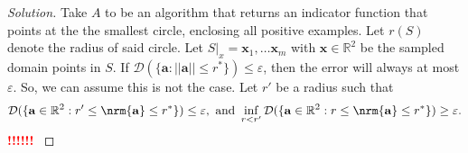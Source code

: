 \documentclass[10pt, a4paper, twoside]{amsart}
\newcommand{\R}{\ensuremath{\mathbb{R}}}
\DeclarePairedDelimiter{\nrm}\lVert\rVert
\newenvironment{solution}
               {\let\oldqedsymbol=\qedsymbol
                \renewcommand{\qedsymbol}{$\blacktriangleleft$}
                \begin{proof}[Solution]}
               {\end{proof}
                \renewcommand{\qedsymbol}{\oldqedsymbol}}
\newcommand{\TODO}{\textcolor{red}{\textbf{!!!!!! }}}
\begin{document}
\begin{solution}
  Take $A$ to be an algorithm that returns an indicator function that points at the the smallest circle, enclosing all positive examples. Let $r(S)$ denote the radius of said circle.
  Let $S|_x  = \mathbf{x}_1,\ldots \mathbf{x}_m$ with $\mathbf{x} \in \R^2$ be the sampled domain points in $S$. 
  If $\mathcal{D}(\{\mathbf{a}:||\mathbf{a}||\leq r^{*}\}) \leq \varepsilon $, 
  then the error will always at most $\varepsilon$.
  So, we can assume this is not the case.
  Let $r'$ be a radius such that
  \begin{equation*}
    \mathcal{D}(\{\mathbf{a} \in \R^2 : r' \leq \nrm{\mathbf{a}} \leq r^*\}) \leq \varepsilon, \text{ and }
    \inf_{r<r'}\mathcal{D}(\{\mathbf{a} \in \R^2 : r \leq \nrm{\mathbf{a}} \leq r^*\}) \geq \varepsilon.
  \end{equation*}
  \TODO
  
\end{solution}
\end{document}
